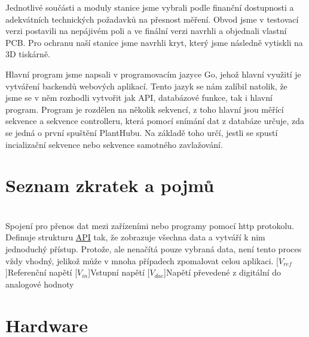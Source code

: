 \documentclass[czech,12pt,a4paper]{article}
\begin{document}
Jednotlivé součásti a moduly stanice jsme vybrali podle finanční dostupnosti a adekvátních technických požadavků na přesnost měření. Obvod jsme v testovací verzi postavili na nepájivém poli a ve finální verzi navrhli a objednali vlastní \ac{PCB}. Pro ochranu naší stanice jsme navrhli kryt, který jsme následně vytiskli na 3D tiskárně.

Hlavní program jsme napsali v programovacím jazyce Go, jehož hlavní využití je vytváření backendů webových aplikací. Tento jazyk se nám zalíbil natolik, že jsme se v něm rozhodli vytvořit jak \ac{API}, databázové funkce, tak i hlavní program. Program je rozdělen na několik sekvencí, z toho hlavní jsou měřící sekvence a sekvence controlleru, která pomocí snímání dat z databáze určuje, zda se jedná o první spuštění PlantHubu. Na základě toho určí, jestli se spustí incializační sekvence nebo sekvence samotného zavlažování.

\clearpage

\section{Seznam zkratek a pojmů}
\begin{acronym}
	 \\
		Spojení pro přenos dat mezi zařízeními nebo programy pomocí http protokolu.
	 \\
		Definuje strukturu \underline{\ac{API}} tak, že zobrazuje všechna data a vytváří k nim jednoduchý přístup. Protože, ale nenačítá pouze vybraná data, není tento proces vždy vhodný, jelikož může v mnoha případech zpomalovat celou aplikaci. 
	[$ V_{ref}$]{Referenční napětí}
	[$ V_{in}$]{Vstupní napětí}
	[$ V_{dac}$]{Napětí převedené z digitální do analogové hodnoty}
\end{acronym}

\clearpage

\section{Hardware}
\end{document}
